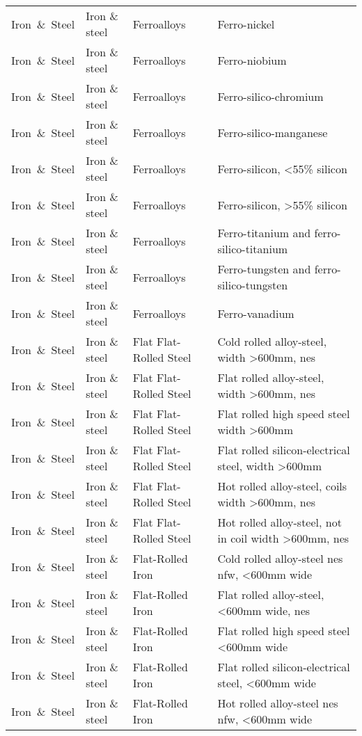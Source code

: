 \begin{appendices}
\begin{xltabular}{\textwidth}{|p{0.07\textwidth}|p{0.12\textwidth}|p{0.20\textwidth}|p{0.5\textwidth}|}
Iron\ \&\ Steel & Iron \& steel & Ferroalloys & Ferro-nickel \\
Iron\ \&\ Steel & Iron \& steel & Ferroalloys & Ferro-niobium \\
Iron\ \&\ Steel & Iron \& steel & Ferroalloys & Ferro-silico-chromium \\
Iron\ \&\ Steel & Iron \& steel & Ferroalloys & Ferro-silico-manganese \\
Iron\ \&\ Steel & Iron \& steel & Ferroalloys & Ferro-silicon, <55\% silicon \\
Iron\ \&\ Steel & Iron \& steel & Ferroalloys & Ferro-silicon, >55\% silicon \\
Iron\ \&\ Steel & Iron \& steel & Ferroalloys & Ferro-titanium and ferro-silico-titanium \\
Iron\ \&\ Steel & Iron \& steel & Ferroalloys & Ferro-tungsten and ferro-silico-tungsten \\
Iron\ \&\ Steel & Iron \& steel & Ferroalloys & Ferro-vanadium \\
Iron\ \&\ Steel & Iron \& steel & Flat Flat-Rolled Steel & Cold rolled alloy-steel, width >600mm, nes \\
Iron\ \&\ Steel & Iron \& steel & Flat Flat-Rolled Steel & Flat rolled alloy-steel, width >600mm, nes \\
Iron\ \&\ Steel & Iron \& steel & Flat Flat-Rolled Steel & Flat rolled high speed steel width >600mm \\
Iron\ \&\ Steel & Iron \& steel & Flat Flat-Rolled Steel & Flat rolled silicon-electrical steel, width >600mm \\
Iron\ \&\ Steel & Iron \& steel & Flat Flat-Rolled Steel & Hot rolled alloy-steel, coils width >600mm, nes \\
Iron\ \&\ Steel & Iron \& steel & Flat Flat-Rolled Steel & Hot rolled alloy-steel, not in coil width >600mm, nes \\
Iron\ \&\ Steel & Iron \& steel & Flat-Rolled Iron & Cold rolled alloy-steel nes nfw, <600mm wide \\
Iron\ \&\ Steel & Iron \& steel & Flat-Rolled Iron & Flat rolled alloy-steel, <600mm wide, nes \\
Iron\ \&\ Steel & Iron \& steel & Flat-Rolled Iron & Flat rolled high speed steel <600mm wide \\
Iron\ \&\ Steel & Iron \& steel & Flat-Rolled Iron & Flat rolled silicon-electrical steel, <600mm wide \\
Iron\ \&\ Steel & Iron \& steel & Flat-Rolled Iron & Hot rolled alloy-steel nes nfw, <600mm wide \\

\end{xltabular}
\end{appendices}
